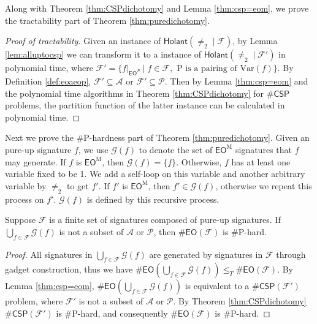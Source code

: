 \documentclass[a4paper,UKenglish,cleveref, autoref, thm-restate]{lipics-v2021}
\newcommand{\hol}[0]{\textsf{Holant}}
\newcommand{\eo}[0]{\textsf{EO}}
\newcommand{\csp}[0]{\textsf{CSP}}
\newcommand{\eom}[1][\text{M}]{\textsf{EO}^{#1}}
\begin{document}
Along with Theorem \ref{thm:CSPdichotomy} and Lemma \ref{thm:csp=eom}, we prove the tractability part of Theorem \ref{thm:puredichotomy}.

\begin{proof}[Proof of tractability]
Given an instance of $\hol(\neq_2\mid\mathcal{F})$, by Lemma \ref{lem:alluptocsp} we can transform it to a instance of $\hol(\neq_2\mid\mathcal{F}')$ in polynomial time, where $\mathcal{F}'=\{f|_{\eom[P]}\mid f\in\mathcal{F},\text{ P is a pairing of Var}(f)\}$. By Definition \ref{def:eoaeop}, $\mathcal{F}'\subseteq\mathscr{A}$ or $\mathcal{F}'\subseteq\mathscr{P}$. Then by Lemma \ref{thm:csp=eom} and the polynomial time algorithms in Theorem \ref{thm:CSPdichotomy} for $\#\csp$ problems, the partition function of the latter instance can be calculated in polynomial time.
\end{proof}

Next we prove the \#P-hardness part of Theorem \ref{thm:puredichotomy}. 
Given an pure-up signature $f$, we use $\mathcal{G}(f)$ to denote the set of $\eom$ signatures that $f$ may generate. If $f$ is $\eom$, then $\mathcal{G}(f)=\{f\}$. Otherwise, $f$ has at least one variable fixed to be 1. We add a self-loop on this variable and another arbitrary variable by $\neq_2$ to get $f'$. If $f'$ is $\eom$, then $f'\in\mathcal{G}(f)$, otherwise we repeat this process on $f'$. $\mathcal{G}(f)$ is defined by this recursive process. 

\begin{lemma}\label{lem:alluphardness}
Suppose $\mathcal{F}$ is a finite set of signatures composed of pure-up  signatures. If $\bigcup_{f\in\mathcal{F}}\mathcal{G}(f)$ is not a subset of $\mathscr{A}$ or $\mathscr{P}$, then $\#\eo(\mathcal{F})$ is \#P-hard.
\end{lemma}
\begin{proof}
    All signatures in $\bigcup_{f\in\mathcal{F}}\mathcal{G}(f)$ are generated by signatures in $\mathcal{F}$ through gadget construction, thus we have $\#\eo(\bigcup_{f\in\mathcal{F}}\mathcal{G}(f))\leq_T\#\eo(\mathcal{F})$. By Lemma \ref{thm:csp=eom}, $\#\eo(\bigcup_{f\in\mathcal{F}}\mathcal{G}(f))$ is equivalent to a $\#\csp(\mathcal{F}')$ problem, where $\mathcal{F}'$ is not a subset of $\mathscr{A}$ or $\mathscr{P}$. By Theorem \ref{thm:CSPdichotomy} $\#\csp(\mathcal{F}')$ is \#P-hard, and consequently $\#\eo(\mathcal{F})$ is \#P-hard.
\end{proof}
\end{document}
